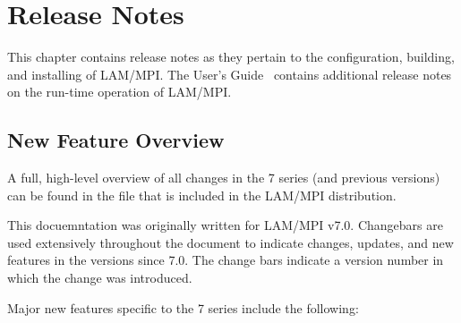 %
% 
%
%

\chapter{Release Notes}
\label{sec:releasenotes}

This chapter contains release notes as they pertain to the
configuration, building, and installing of LAM/MPI.  The User's
Guide~\cite{lamteam03:_lam_mpi_user_guide} contains additional release
notes on the run-time operation of LAM/MPI.


\section{New Feature Overview}

A full, high-level overview of all changes in the 7 series (and
previous versions) can be found in the  file that is
included in the LAM/MPI distribution.

This docuemntation was originally written for LAM/MPI v7.0.
Changebars are used extensively throughout the document to indicate
changes, updates, and new features in the versions since 7.0.  The
change bars indicate a version number in which the change was
introduced.

Major new features specific to the 7 series include the following:

